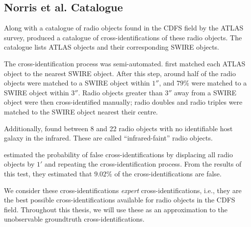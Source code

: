 
        \subsection{Norris et al. Catalogue}
        \label{sec:norris}

            Along with a catalogue of radio objects found in the CDFS field by
            the ATLAS survey, \citet{norris06} produced a catalogue of
            cross-identifications of these radio objects. The catalogue lists
            ATLAS objects and their corresponding SWIRE objects.

            The cross-identification process was semi-automated.
            \citeauthor{norris06} first matched each ATLAS object to the nearest
            SWIRE object. After this step, around half of the radio objects were
            matched to a SWIRE object within $1''$, and $79\%$ were matched to a
            SWIRE object within $3''$. Radio objects greater than $3''$ away
            from a SWIRE object were then cross-identified manually; radio
            doubles and radio triples were matched to the SWIRE object nearest
            their centre.

            Additionally, \citeauthor{norris06} found between 8 and 22 radio
            objects with no identifiable host galaxy in the infrared. These are
            called ``infrared-faint'' radio objects.

            \citeauthor{norris06} estimated the probability of false
            cross-identifications by displacing all radio objects by $1'$ and
            repeating the cross-identification process. From the results of this
            test, they estimated that $9.02\%$ of the cross-identifications are
            false.

            We consider these cross-identifications \emph{expert}
            cross-identifications, i.e., they are the best possible
            cross-identifications available for radio objects in the CDFS field.
            Throughout this thesis, we will use these as an approximation to the
            unobservable groundtruth cross-identifications.

